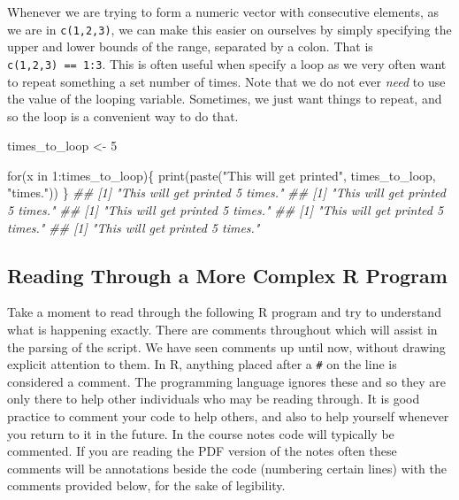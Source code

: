 \documentclass[
  letterpaper,
  DIV=11,
  numbers=noendperiod]{scrreprt}
\newenvironment{Shaded}{\begin{snugshade}}{\end{snugshade}}
\newcommand{\ControlFlowTok}[1]{\textcolor[rgb]{0.00,0.23,0.31}{#1}}
\newcommand{\DecValTok}[1]{\textcolor[rgb]{0.68,0.00,0.00}{#1}}
\newcommand{\DocumentationTok}[1]{\textcolor[rgb]{0.37,0.37,0.37}{\textit{#1}}}
\newcommand{\FunctionTok}[1]{\textcolor[rgb]{0.28,0.35,0.67}{#1}}
\newcommand{\NormalTok}[1]{\textcolor[rgb]{0.00,0.23,0.31}{#1}}
\newcommand{\OtherTok}[1]{\textcolor[rgb]{0.00,0.23,0.31}{#1}}
\newcommand{\SpecialCharTok}[1]{\textcolor[rgb]{0.37,0.37,0.37}{#1}}
\newcommand{\StringTok}[1]{\textcolor[rgb]{0.13,0.47,0.30}{#1}}
\theoremstyle{definition}
\theoremstyle{definition}
\theoremstyle{definition}
\theoremstyle{remark}
\begin{document}
Whenever we are trying to form a numeric vector with consecutive
elements, as we are in \texttt{c(1,2,3)}, we can make this easier on
ourselves by simply specifying the upper and lower bounds of the range,
separated by a colon. That is \texttt{c(1,2,3)\ ==\ 1:3}. This is often
useful when specify a loop as we very often want to repeat something a
set number of times. Note that we do not ever \emph{need} to use the
value of the looping variable. Sometimes, we just want things to repeat,
and so the loop is a convenient way to do that.

\begin{Shaded}
\begin{Highlighting}[]
\NormalTok{times\_to\_loop }\OtherTok{\textless{}{-}} \DecValTok{5}

\ControlFlowTok{for}\NormalTok{(x }\ControlFlowTok{in} \DecValTok{1}\SpecialCharTok{:}\NormalTok{times\_to\_loop)\{}
    \FunctionTok{print}\NormalTok{(}\FunctionTok{paste}\NormalTok{(}\StringTok{"This will get printed"}\NormalTok{, times\_to\_loop, }\StringTok{"times."}\NormalTok{))}
\NormalTok{\}}
\DocumentationTok{\#\# [1] "This will get printed 5 times."}
\DocumentationTok{\#\# [1] "This will get printed 5 times."}
\DocumentationTok{\#\# [1] "This will get printed 5 times."}
\DocumentationTok{\#\# [1] "This will get printed 5 times."}
\DocumentationTok{\#\# [1] "This will get printed 5 times."}
\end{Highlighting}
\end{Shaded}

\subsection{Reading Through a More Complex R
Program}\label{reading-through-a-more-complex-r-program}

Take a moment to read through the following R program and try to
understand what is happening exactly. There are comments throughout
which will assist in the parsing of the script. We have seen comments up
until now, without drawing explicit attention to them. In R, anything
placed after a \texttt{\#} on the line is considered a comment. The
programming language ignores these and so they are only there to help
other individuals who may be reading through. It is good practice to
comment your code to help others, and also to help yourself whenever you
return to it in the future. In the course notes code will typically be
commented. If you are reading the PDF version of the notes often these
comments will be annotations beside the code (numbering certain lines)
with the comments provided below, for the sake of legibility.
\end{document}
